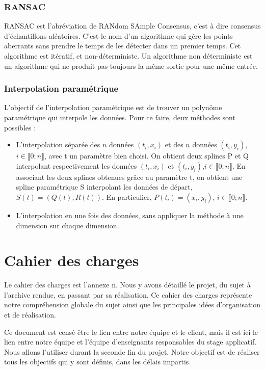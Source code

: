 \documentclass[a4paper,12pt]{article} %
\begin{document}
\subsubsection*{RANSAC}

RANSAC est l'abréviation de RANdom SAmple Consensus, c'est à dire consensus d'échantillons aléatoires. C'est le nom d'un algorithme qui gère les points aberrants sans prendre le temps de les détecter dans un premier temps. Cet algorithme est itératif, et non-déterministe. Un algorithme non déterministe est un algorithme qui ne produit pas toujours la même sortie pour une même entrée.

\subsubsection*{Interpolation paramétrique}

L'objectif de l'interpolation paramétrique est de trouver un polynôme paramétrique qui interpole les données. Pour ce faire, deux méthodes sont possibles :
\begin{itemize}
\item L'interpolation séparée des $n$ données $(t_i,x_i)$ et des $n$ données $(t_i,y_i)$, $i\in\llbracket 0; n \rrbracket$, avec t un paramètre bien choisi. On obtient deux splines P et Q interpolant respectivement les données $(t_i,x_i)$ et $(t_i,y_i)$,$i\in\llbracket 0; n \rrbracket$. En associant les deux splines obtenues grâce au paramètre t, on obtient une spline paramétrique S interpolant les données de départ, $S(t) = (Q(t),R(t))$. En particulier, $P(t_i) = (x_i,y_i)$, $i\in\llbracket 0; n \rrbracket$.
\item L'interpolation en une fois des données, sans appliquer la méthode à une dimension sur chaque dimension.
\end{itemize}


\section{Cahier des charges}

Le cahier des charges est l'annexe n. Nous y avons détaillé le projet, du sujet à l'archive rendue, en passant par sa réalisation. Ce cahier des charges représente notre compréhension globale du sujet ainsi que les principales idées d'organisation et de réalisation.

Ce document est censé être le lien entre notre équipe et le client, mais il est ici le lien entre notre équipe et l'équipe d'enseignants responsables du stage applicatif. Nous allons l'utiliser durant la seconde fin du projet. Notre objectif est de réaliser tous les objectifs qui y sont définis, dans les délais impartis.
\end{document}
